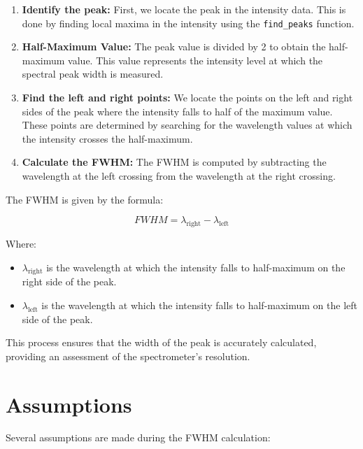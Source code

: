 \documentclass{article}
\begin{document}
    \begin{enumerate}
        \item \textbf{Identify the peak:} First, we locate the peak in the intensity data. This is done by finding local maxima in the intensity using the \texttt{find\_peaks} function.
        \item \textbf{Half-Maximum Value:} The peak value is divided by 2 to obtain the half-maximum value. This value represents the intensity level at which the spectral peak width is measured.
        \item \textbf{Find the left and right points:} We locate the points on the left and right sides of the peak where the intensity falls to half of the maximum value. These points are determined by searching for the wavelength values at which the intensity crosses the half-maximum.
        \item \textbf{Calculate the FWHM:} The FWHM is computed by subtracting the wavelength at the left crossing from the wavelength at the right crossing.
    \end{enumerate}

    The FWHM is given by the formula:

    \[
    FWHM = \lambda_{\text{right}} - \lambda_{\text{left}}
    \]

    Where:
    \begin{itemize}
        \item $\lambda_{\text{right}}$ is the wavelength at which the intensity falls to half-maximum on the right side of the peak.
        \item $\lambda_{\text{left}}$ is the wavelength at which the intensity falls to half-maximum on the left side of the peak.
    \end{itemize}

    This process ensures that the width of the peak is accurately calculated, providing an assessment of the spectrometer's resolution.

    \section*{Assumptions}

    Several assumptions are made during the FWHM calculation:
\end{document}
